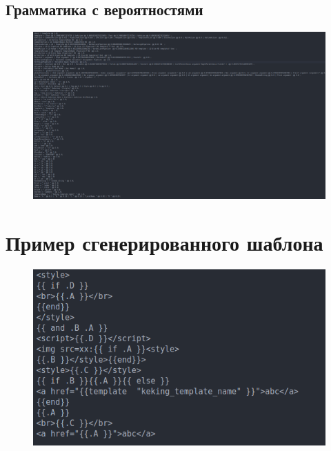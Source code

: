 \documentclass[a4paper]{article}
\begin{document}
\newpage

\appendix

\begin{landscape}
\section{Грамматика с вероятностями}

\begin{figure}[ht!]
    \includegraphics[width=260mm]{probabilities.png}
    \label{Probabilities}
    \end{figure}
\end{landscape}

\section{Пример сгенерированного шаблона}

\begin{figure}[ht!]
    \includegraphics[width=170mm]{Template.png}
    \label{GeneratedTemplate}
    \end{figure}
\end{document}
